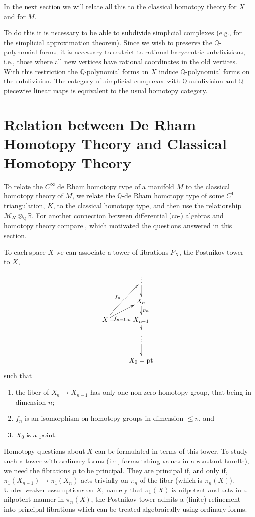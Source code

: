 \documentclass[11pt]{amsart}
\theoremstyle{plain}
\theoremstyle{definition}
\newcommand{\cM}{\mathcal{M}}
\newcommand{\RR}{\mathbb{R}}
\newcommand{\QQ}{\mathbb{Q}}
\begin{document}
In the next section we will relate all this to the classical homotopy theory for $X$ and for $M$.

To do this it is necessary to be able to subdivide simplicial complexes (e.g., for the simplicial approximation theorem). Since we wish to preserve the $\QQ$-polynomial forms, it is necessary to restrict to rational barycentric subdivisions, i.e., those where all new vertices have rational coordinates in the old vertices. With this restriction the $\QQ$-polynomial forms on $X$ induce $\QQ$-polynomial forms on the subdivision. The category of simplicial complexes with $\QQ$-subdivision and $\QQ$-piecewise linear maps is equivalent to the usual homotopy category.


\section{Relation between De Rham Homotopy Theory and Classical Homotopy Theory}

To relate the $C^{\infty}$ de Rham homotopy type of a manifold $M$ to the classical homotopy theory of $M$, we relate the $\QQ$-de Rham homotopy type of some $C^{1}$ triangulation, $K$, to the classical homotopy type, and then use the relationship $\cM_{K} \otimes_{\QQ} \RR$. For another connection between differential (co-) algebras and homotopy theory compare \cite{Q}, which motivated the questions answered in this section.

To each space $X$ we can associate a tower of fibrations $P_{X}$, the Postnikov tower to $X$,
\[
\xymatrix@R=1pc{
& \vdots \ar[d] \\
& X_{n} \ar[d]^{p_{n}} \\
X \ar[uur]^{f_{n}} \ar[ur]_(0.3){f_{n-1}} \ar[r] & X_{n-1} \ar[d] \\
& \vdots \ar[d] \\
& X_{0} = \text{pt}
}
\]
such that
\begin{enumerate}
\item the fiber of $X_{n} \to X_{n-1}$ has only one non-zero homotopy group, that being in dimension $n$;
\item $f_{n}$ is an isomorphism on homotopy groups in dimension $\le n$, and
\item $X_{0}$ is a point.
\end{enumerate}

Homotopy questions about $X$ can be formulated in terms of this tower. To study such a tower with ordinary forms (i.e., forms taking values in a constant bundle), we need the fibrations $p$ to be principal. They are principal if, and only if, $\pi_{1}(X_{n-1}) \to \pi_{1}(X_{n})$ acts trivially on $\pi_{n}$ of the fiber (which is $\pi_{n}(X)$). Under weaker assumptions on $X$, namely that $\pi_{1}(X)$ is nilpotent and acts in a nilpotent manner in $\pi_{n}(X)$, the Postnikov tower admits a (finite) refinement into principal fibrations which can be treated algebraically using ordinary forms.
\end{document}
